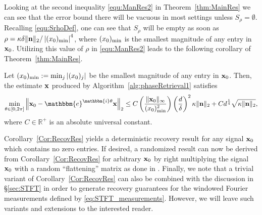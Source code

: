 Looking at the second inequality \eqref{equ:ManRes2} in Theorem~\ref{thm:MainRes} we can see that the error bound there will be vacuous in most settings unless $S_\rho = \emptyset$.  Recalling \eqref{equ:SrhoDef}, one can see that $S_\rho$ will be empty as soon as $\rho = \kappa \delta \| \mathbf n \|_2 / \left| (x_0)_{\rm min} \right|^4$, where $(x_0)_{\rm min}$ is the smallest magnitude of any entry in $\mathbf x_0$.  Utilizing this value of $\rho$ in \eqref{equ:ManRes2} leads to the following corollary of Theorem~\ref{thm:MainRes}.

\begin{corollary}
Let $(x_0)_{\rm min} := \min_j |(x_0)_j|$ be the smallest magnitude of any entry in $\mathbf x_0$.  Then, the estimate $\mathbf x$ produced by Algorithm~\ref{alg:phaseRetrieval1} satisfies 
\[ \min_{\theta \in [0, 2 \pi]} \left\Vert  \x_0 - \mathbbm{e}^{\mathbbm{i} \theta} \x \right\Vert_2 \leq C \left( \frac{\Vert \x_0 
        \Vert_{\infty}}{(x_0)^2_{\rm min}} \right) \left( \frac{d}{\delta} \right)^2 \kappa \| \n \|_2 + C d^{\frac{1}{4}} \sqrt{\kappa \| \n \|_2 },\]
where $C \in \mathbb{R}^+$ is an absolute universal constant.  
\label{Cor:RecovRes}
\end{corollary}

Corollary~\ref{Cor:RecovRes} yields a deterministic recovery result for any signal $\mathbf x_0$ which contains no zero entries.  If desired, a randomized result can now be derived from Corollary~\ref{Cor:RecovRes} for arbitrary $\mathbf x_0$ by right multiplying the signal $\mathbf x_0$ %
with a random ``flattening'' matrix as done in \cite{IVW2015_FastPhase}.   Finally, we note that a trivial variant of Corollary~\ref{Cor:RecovRes} can also be combined with the discussion in \S \ref{sec:STFT} in order to generate recovery guarantees for the windowed Fourier measurements defined by \eqref{eq:STFT_measurements}.  However, we will leave such variants and extensions to the interested reader.
